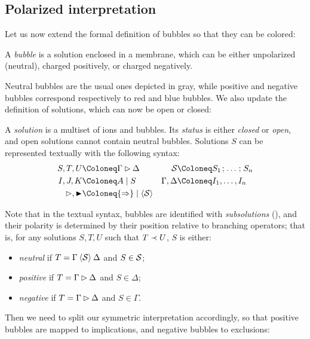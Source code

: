 \subsection{Polarized interpretation}

Let us now extend the formal definition of bubbles so that they can be colored:

\begin{definition}[Bubble]
  A \emph{bubble} is a solution enclosed in a membrane, which can be either
  unpolarized (neutral), charged positively, or charged negatively.
\end{definition}

Neutral bubbles are the usual ones depicted in gray, while positive and negative
bubbles correspond respectively to red and blue bubbles. We also update the
definition of solutions, which can now be open or closed:

\begin{definition}[Solution]
  
  A \emph{solution} is a multiset of ions and bubbles. Its \emph{status} is
  either \emph{closed} or \emph{open}, and open solutions cannot contain neutral
  bubbles. Solutions $S$ can be represented textually with the following syntax:
  \begin{align*}
    S, T, U &\Coloneq \Gamma \J \Delta &
    \cS &\Coloneq S_1 \sep \ldots \sep S_n \\
    I, J, K &\Coloneq A \mid S &
    \Gamma, \Delta &\Coloneq I_1, \ldots, I_n \\
    \J, \JB &\Coloneq {\seq} \mid {\piq{\cS}} &&
  \end{align*}
\end{definition}

Note that in the textual syntax, bubbles are identified with \emph{subsolutions}
(), and their polarity is determined by their position
relative to branching operators; that is, for any solutions $S, T, U$ such that
$T \prec U$, $S$ is either:
\begin{itemize}
  \item \emph{neutral} if $T = \Gamma \mathbin{\langle \mathcal{S} \rangle} \Delta$ and $S \in
  \mathcal{S}$;
  \item \emph{positive} if $T = \Gamma \mathbin{\rhd} \Delta$ and $S \in \Delta$;
  \item \emph{negative} if $T = \Gamma \mathbin{\rhd} \Delta$ and $S \in \Gamma$.
\end{itemize}

Then we need to split our symmetric interpretation accordingly, so that positive
bubbles are mapped to implications, and negative bubbles to
exclusions:

